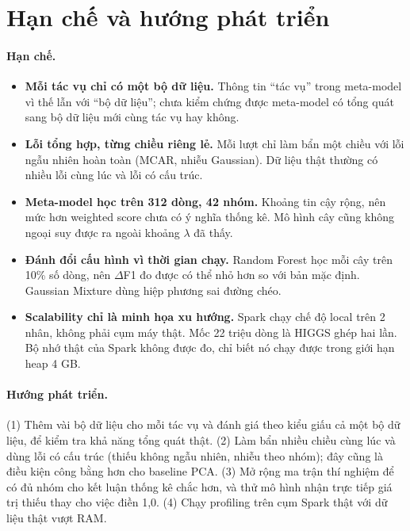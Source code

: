 \section{Hạn chế và hướng phát triển}
\label{sec:han-che}

\paragraph{Hạn chế.}
\begin{itemize}
  \item \textbf{Mỗi tác vụ chỉ có một bộ dữ liệu.} Thông tin ``tác vụ'' trong meta-model vì thế lẫn với ``bộ dữ liệu''; chưa kiểm chứng được meta-model có tổng quát sang bộ dữ liệu mới cùng tác vụ hay không.
  \item \textbf{Lỗi tổng hợp, từng chiều riêng lẻ.} Mỗi lượt chỉ làm bẩn một chiều với lỗi ngẫu nhiên hoàn toàn (MCAR, nhiễu Gaussian). Dữ liệu thật thường có nhiều lỗi cùng lúc và lỗi có cấu trúc.
  \item \textbf{Meta-model học trên 312 dòng, 42 nhóm.} Khoảng tin cậy rộng, nên mức hơn weighted score chưa có ý nghĩa thống kê. Mô hình cây cũng không ngoại suy được ra ngoài khoảng $\lambda$ đã thấy.
  \item \textbf{Đánh đổi cấu hình vì thời gian chạy.} Random Forest học mỗi cây trên 10\% số dòng, nên $\Delta$F1 đo được có thể nhỏ hơn so với bản mặc định. Gaussian Mixture dùng hiệp phương sai đường chéo.
  \item \textbf{Scalability chỉ là minh họa xu hướng.} Spark chạy chế độ local trên 2 nhân, không phải cụm máy thật. Mốc 22 triệu dòng là HIGGS ghép hai lần. Bộ nhớ thật của Spark không được đo, chỉ biết nó chạy được trong giới hạn heap 4 GB.
\end{itemize}

\paragraph{Hướng phát triển.} (1) Thêm vài bộ dữ liệu cho mỗi tác vụ và đánh giá theo kiểu giấu cả một bộ dữ liệu, để kiểm tra khả năng tổng quát thật. (2) Làm bẩn nhiều chiều cùng lúc và dùng lỗi có cấu trúc (thiếu không ngẫu nhiên, nhiễu theo nhóm); đây cũng là điều kiện công bằng hơn cho baseline PCA. (3) Mở rộng ma trận thí nghiệm để có đủ nhóm cho kết luận thống kê chắc hơn, và thử mô hình nhận trực tiếp giá trị thiếu thay cho việc điền 1,0. (4) Chạy profiling trên cụm Spark thật với dữ liệu thật vượt RAM.
